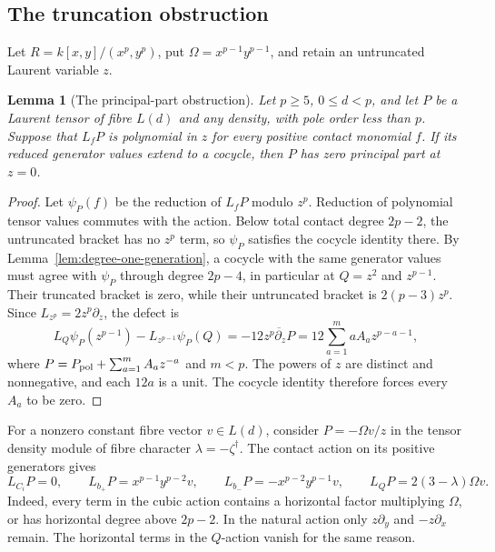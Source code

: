 \documentclass[11pt]{article}
\theoremstyle{plain}
\newtheorem{lemma}[lemma]{Lemma}
\theoremstyle{definition}
\theoremstyle{remark}
\numberwithin{equation}{section}
\newcommand{\kk}{k}
\begin{document}
\subsection{The truncation obstruction}\label{sec:maxz-natural}

Let \(R=\kk[x,y]/(x^p,y^p)\), put \(\Omega=x^{p-1}y^{p-1}\),
and retain an untruncated Laurent variable \(z\).

\begin{lemma}[The principal-part obstruction]\label{lem:principal-part}
Let $p\ge5$, $0\le d<p$, and let $P$ be a Laurent tensor of
fibre $L(d)$ and any density, with pole order less than $p$.
Suppose that $L_fP$ is polynomial in $z$ for every positive contact
monomial $f$. If its reduced generator values extend to a cocycle,
then $P$ has zero principal part at $z=0$.
\end{lemma}
\begin{proof}
Let $\psi_P(f)$ be the reduction of $L_fP$ modulo $z^p$.
Reduction of polynomial tensor values commutes with the action.
Below total contact degree $2p-2$, the untruncated bracket has no
$z^p$ term, so $\psi_P$ satisfies the cocycle identity there.
By Lemma~\ref{lem:degree-one-generation}, a cocycle with the same
generator values must agree with $\psi_P$ through degree $2p-4$,
in particular at $Q=z^2$ and $z^{p-1}$.
Their truncated bracket is zero, while their untruncated bracket is
$2(p-3)z^p$. Since $L_{z^p}=2z^p\partial_z$, the defect is
\begin{equation}\label{eq:principal-part-defect}
 L_Q\psi_P(z^{p-1})-L_{z^{p-1}}\psi_P(Q)
 =-12\overline{z^p\partial_zP}
 =12\sum_{a=1}^m aA_a z^{p-a-1},
\end{equation}
where $P=P_{\rm pol}+\sum_{a=1}^m A_a z^{-a}$ and $m<p$.
The powers of $z$ are distinct and nonnegative, and each $12a$ is a unit.
The cocycle identity therefore forces every $A_a$ to be zero.
\end{proof}

For a nonzero constant fibre vector \(v\in L(d)\), consider
\(P=-\Omega v/z\) in the tensor density module of fibre character
\(\lambda=-\zeta^\dagger\).
The contact action on its positive generators gives
\begin{equation}\label{eq:top-pole-data}
 L_{C_i}P=0,\qquad
 L_{b_+}P=x^{p-1}y^{p-2}v,\qquad
 L_{b_-}P=-x^{p-2}y^{p-1}v,\qquad
 L_QP=2(3-\lambda)\Omega v .
\end{equation}
Indeed, every term in the cubic action contains a horizontal
factor multiplying \(\Omega\), or has horizontal degree above \(2p-2\).
In the natural action only \(z\partial_y\) and \(-z\partial_x\)
remain. The horizontal terms in the \(Q\)-action vanish for the
same reason.
\end{document}
